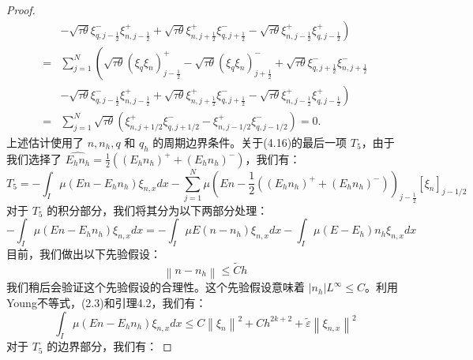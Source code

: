 \begin{proof}
\begin{equation}
\begin{split}
            & \left.-\sqrt{\tau \theta} \xi_{q, j-\frac{1}{2}}^{-} \xi_{n, j-\frac{1}{2}}^{+}+\sqrt{\tau \theta} \xi_{n, j+\frac{1}{2}}^{+} \xi_{q, j+\frac{1}{2}}^{-}-\sqrt{\tau \theta} \xi_{n, j-\frac{1}{2}}^{+} \xi_{q, j-\frac{1}{2}}^{+}\right)  \\
            =      & \sum_{j=1}^{N}\left(\sqrt{\tau \theta}\left(\xi_{q} \xi_{n}\right)_{j-\frac{1}{2}}^{+}-\sqrt{\tau \theta}\left(\xi_{q} \xi_{n}\right)_{j+\frac{1}{2}}^{-}+\sqrt{\tau \theta} \xi_{q, j+\frac{1}{2}}^{-} \xi_{n, j+\frac{1}{2}}^{-}\right. \\
            & \left.-\sqrt{\tau \theta} \xi_{q, j-\frac{1}{2}}^{-} \xi_{n, j-\frac{1}{2}}^{+}+\sqrt{\tau \theta} \xi_{n, j+\frac{1}{2}}^{+} \xi_{q, j+\frac{1}{2}}^{-}-\sqrt{\tau \theta} \xi_{n, j-\frac{1}{2}}^{+} \xi_{q, j-\frac{1}{2}}^{+}\right)  \\
            =      & \sum_{j=1}^{N} \sqrt{\tau \theta}\left(\xi_{n, j+1 / 2}^{+} \xi_{q, j+1 / 2}^{-}-\xi_{n, j-1 / 2}^{+} \xi_{q, j-1 / 2}^{-}\right)=0 .
        \end{split}
    \end{equation}
    上述估计使用了 $n, n_{h}, q$ 和 $q_{h}$ 的周期边界条件。关于(4.16)的最后一项 $T_{5}$，由于我们选择了 $\widehat{E_{h} n_{h}}=\frac{1}{2}\left(\left(E_{h} n_{h}\right)^{+}+\left(E_{h} n_{h}\right)^{-}\right)$，我们有：
    \begin{equation}
        T_{5}=-\int_{I} \mu\left(E n-E_{h} n_{h}\right) \xi_{n, x} d x-\sum_{j=1}^{N} \mu\left(E n-\frac{1}{2}\left(\left(E_{h} n_{h}\right)^{+}+\left(E_{h} n_{h}\right)^{-}\right)\right)_{j-\frac{1}{2}}\left[\xi_{n}\right]_{j-1 / 2}
    \end{equation}
    对于 $T_{5}$ 的积分部分，我们将其分为以下两部分处理：
    $$
        -\int_{I} \mu\left(E n-E_{h} n_{h}\right) \xi_{n, x} d x=-\int_{I} \mu E\left(n-n_{h}\right) \xi_{n, x} d x-\int_{I} \mu\left(E-E_{h}\right) n_{h} \xi_{n, x} d x
    $$
    目前，我们做出以下先验假设：
    \begin{equation}
        \left\|n-n_{h}\right\| \leq \tilde{C} h
    \end{equation}
    我们稍后会验证这个先验假设的合理性。这个先验假设意味着 $\left|n_{h}\right|{L^{\infty}} \leq C$。利用Young不等式，(2.3)和引理4.2，我们有：
    \begin{equation}
        \int_{I} \mu\left(E n-E_{h} n_{h}\right) \xi_{n, x} d x \leq C\left\|\xi_{n}\right\|^{2}+C h^{2 k+2}+\tilde{\varepsilon}\left\|\xi_{n, x}\right\|^{2}
    \end{equation}
    对于 $T_{5}$ 的边界部分，我们有：

\end{proof}
